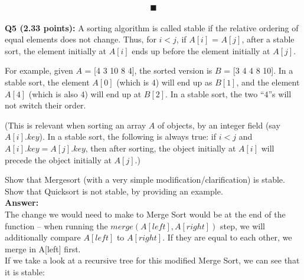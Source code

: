 \documentclass[a4paper,12pt]{article}
\begin{document}
$$\blacksquare$$\\

\textbf{Q5 (2.33 points):} A sorting algorithm is called stable if the relative ordering of equal elements does not change. Thus, for $i < j$, if $A[i]$ = $A[j]$, after a stable sort, the element initially at $A[i]$ ends up before the element initially at $A[j]$.

For example, given $A$ = [4 3 10 8 4], the sorted version is $B$ = [3 4 4 8 10]. In a stable sort, the element $A[0]$ (which is $4$) will end up as $B[1]$, and the element $A[4]$ (which is also $4$) will end up at $B[2]$. In a stable sort, the two “$4$”s will not switch their order.

(This is relevant when sorting an array $A$ of objects, by an integer field (say $A[i].key$). In a stable sort, the following is always true: if $i < j$ and $A[i].key = A[j].key$, then after sorting, the object initially at $A[i]$ will precede the object initially at $A[j]$.)

Show that Mergesort (with a very simple modification/clarification) is stable. Show that Quicksort is not stable, by providing an example.\\

\textbf{Answer:}\\

The change we would need to make to Merge Sort would be at the end of the function -- when running the $merge(A[left], A[right])$ step, we will additionally compare $A[left]$ to $A[right]$. If they are equal to each other, we merge in A[left] first.\\

If we take a look at a recursive tree for this modified Merge Sort, we can see that it is stable:\\
\end{document}

